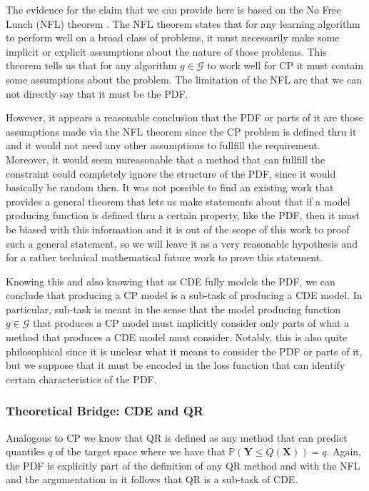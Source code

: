 The evidence for the claim that we can provide here is based on the No Free Lunch (NFL) theorem \cite{wolpert1997no}. The NFL theorem states that for any learning algorithm to perform well on a broad class of problems, it must necessarily make some implicit or explicit assumptions about the nature of those problems. This theorem tells us that for any algorithm $g\in\mathcal{G}$ to work well for CP it must contain some assumptions about the problem. The limitation of the NFL are that we can not directly say that it must be the PDF.

However, it appears a reasonable conclusion that the PDF or parts of it are those assumptions made via the NFL theorem since the CP problem is defined thru it and it would not need any other assumptions to fullfill the requirement. Moreover, it would seem unreasonable that a method that can fullfill the constraint could completely ignore the structure of the PDF, since it would basically be random then. It was not possible to find an existing work that provides a general theorem that lets us make statements about that if a model producing function is defined thru a certain property, like the PDF, then it must be biased with this information and it is out of the scope of this work to proof such a general statement, so we will leave it as a very reasonable hypothesis and for a rather technical mathematical future work to prove this statement.

Knowing this and also knowing that as CDE fully models the PDF, we can conclude that producing a CP model is a sub-task of producing a CDE model. In particular, sub-task is meant in the sense that the model producing function $g \in \mathcal{G}$ that produces a CP model must implicitly consider only parts of what a method that produces a CDE model must consider. Notably, this is also quite philosophical since it is unclear what it means to consider the PDF or parts of it, but we suppose that it must be encoded in the loss function that can identify certain characteristics of the PDF.

\subsubsection{Theoretical Bridge: CDE and QR}\label{sec:bridge_cde_qr}

Analogous to CP we know that QR is defined as any method that can predict quantiles $q$ of the target space where we have that $\mathbb{P}(\mathbf{Y} \leq Q(\mathbf{X})) = q$. Again, the PDF is explicitly part of the definition of any QR method and with the NFL and the argumentation in  it follows that QR is a sub-task of CDE.

